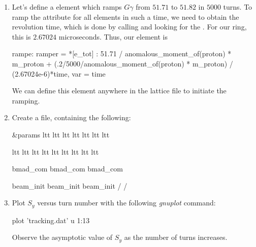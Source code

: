 \documentclass{hitec}     %
\begin{document}
{{{{\begin{enumerate}[leftmargin=*]
\item Let's define a  element which ramps $G\gamma$ from $51.71$ to $51.82$ in $5000$ turns. To ramp the  attribute for all elements in such a time, we need to obtain the revolution time, which is done by calling  and looking for the
. For our ring, this is $2.67024$ microseconds. Thus, our  element is

\begin{code}
rampe: ramper = {*[e_tot] : 51.71 / anomalous_moment_of(proton) * m_proton + 
(.2/5000/anomalous_moment_of(proton) * m_proton) / (2.67024e-6)*time}, var = {time} 
\end{code}

We can define this element anywhere in the lattice file to initiate the ramping.

\item Create a  file, containing the following:
\begin{code}
&params
  ltt%
  ltt%
  ltt%
  ltt%
  ltt%
  ltt%
  ltt%

  ltt%
  ltt%
  ltt%
  ltt%
  ltt%
  ltt%
  ltt%
  ltt%
  ltt%

  bmad_com%
  bmad_com%
  bmad_com%

  beam_init%
  beam_init%
  beam_init%
/
/
\end{code}

\item Plot $S_y$ versus turn number with the following \textit{gnuplot} command:
\begin{code}
plot 'tracking.dat' u 1:13
\end{code}
Observe the asymptotic value of $S_y$ as the number of turns increases.


\end{enumerate}}}}}
\end{document}
